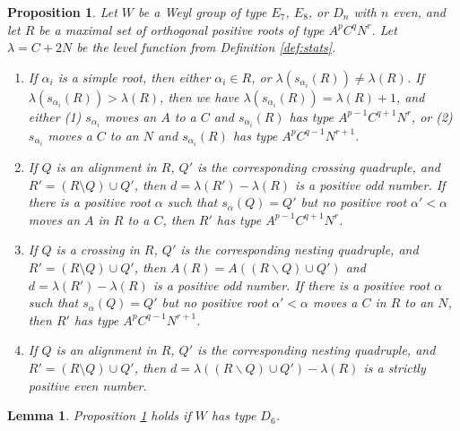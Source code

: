 \documentclass[11pt]{amsart}
\theoremstyle{plain}
\newtheorem{lemma}[theorem]{Lemma}
\newtheorem{prop}[theorem]{Proposition}
\theoremstyle{definition}
\theoremstyle{remark}
\numberwithin{equation}{subsection}
\newcommand{\al}{\alpha}
\begin{document}
\begin{prop}\label{prop:miracle}
Let $W$ be a Weyl group of type $E_7$, $E_8$, or $D_{n}$ with $n$ even, and let
$R$ be a maximal set of  orthogonal positive roots of type $A^p C^q N^r$. Let
$\lambda=C+2N$ be the level function from Definition \ref{def:stats}.
\begin{enumerate}
    \item[{\rm (i)}]{If $\al_i$ is a simple root, then either $\al_i \in R$, or
         $\lambda(s_{\al_i}(R)) \ne \lambda(R)$.  If $\lambda(s_{\al_i}(R)) >
         \lambda(R)$, then we have $\lambda(s_{\al_i}(R)) = \lambda(R) + 1$, and
         either (1) $s_{\al_i}$ moves an $A$ to a $C$ and $s_{\al_i}(R)$ has
         type $A^{p-1}C^{q+1}N^r$, or (2) $s_{\al_i}$ moves a $C$ to an $N$ and
     $s_{\al_i}(R)$ has type $A^pC^{q-1}N^{r+1}$.}
 \item[{\rm (ii)}]If $Q$ is an alignment in $R$, $Q'$ is the corresponding
     crossing quadruple, and $R'=(R\setminus Q)\cup Q'$,  then $d = \lambda(R')
     - \lambda(R)$ is a positive odd number.  If there is a positive root $\al$
     such that $s_\alpha(Q)=Q'$ but no positive root $\al'<\al$ moves an $A$ in
     $R$ to
     a $C$, then $R'$ has type $A^{p-1}C^{q+1}N^{r}$.
 \item[{\rm (iii)}]If $Q$ is a crossing in $R$, $Q'$ is the corresponding
      nesting quadruple, and $R'=(R\setminus Q)\cup Q'$, then $A(R) = A((R
      \backslash Q) \cup Q')$ and $d = \lambda(R') - \lambda(R)$ is a positive
      odd number.  If there is a positive root $\al$ such that $s_\alpha(Q)=Q'$
      but no positive root $\al'<\al$ moves a $C$ in $R$ to an $N$, then $R'$
      has type $A^{p}C^{q-1}N^{r+1}$.
  \item[{\rm (iv)}] If $Q$ is an alignment in $R$, $Q'$ is the corresponding
      nesting quadruple, and $R'=(R\setminus Q)\cup Q'$, then $d = \lambda((R
      \backslash Q) \cup Q') - \lambda(R)$ is a strictly positive even number.
\end{enumerate}
\end{prop}

\begin{lemma}\label{lem:d6miracle}
Proposition \ref{prop:miracle} holds if $W$ has type $D_6$.
\end{lemma}
\end{document}
